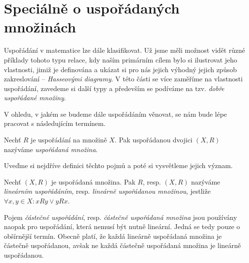 \section{Speciálně o uspořádaných množinách}\label{sec:specialne_o_usporadanych_mozinach}
Uspořádání v matematice lze dále klasifikovat. Už jsme měli možnost vidět různé příklady tohoto typu relace, kdy naším primárním cílem bylo si ilustrovat jeho vlastnosti, jimiž je definována a ukázat si pro nás jejich výhodný jejich způsob zakreslování -- \emph{Hasseovými diagramy}. V této části se více zaměříme na vlastnosti uspořádání, zavedeme si další typy a především se podíváme na tzv. \emph{dobře uspořádané množiny}.\par
V ohledu, v jakém se budeme dále uspořádáním věnovat, se nám bude lépe pracovat s následujícím termínem.
\begin{definition}
    Nechť $R$ je uspořádání na množině $X$. Pak uspořádanou dvojici $(X,R)$ nazýváme \emph{uspořádaná množina}.
\end{definition}
Uveďme si nejdříve definici těchto pojmů a poté si vysvětleme jejich význam.
\begin{definition}
    Nechť $(X,R)$ je uspořádaná množina. Pak $R$, resp. $(X,R)$ nazýváme \emph{lineárním uspořádáním}, resp. \emph{lineárně uspořádanou množinou}, jestliže $\forall x,y\in X: xRy \lor yRx$.
\end{definition}
Pojem \emph{částečné uspořádání}, resp. \emph{částečně uspořádaná množina} jsou používány naopak pro uspořádání, která nemusí být nutně lineární. Jedná se tedy pouze o obšírnější termín. Obecně platí, že každá lineárně uspořádaná množina je částečně uspořádanou, avšak ne každá částečně uspořádaná množina je lineárně uspořádanou.
